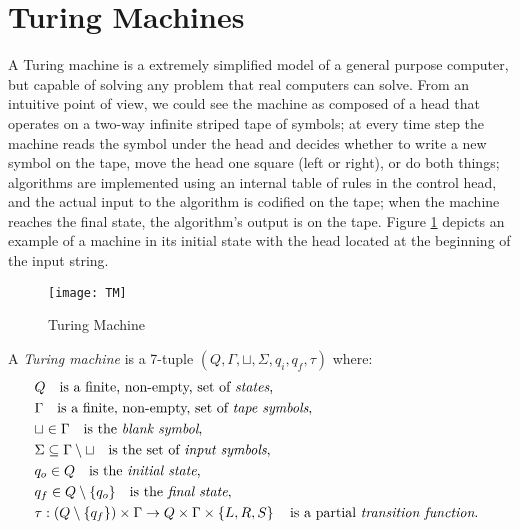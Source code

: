%
%

\section{Turing Machines}
\label{sec:Turing-Machines}

A Turing machine is a extremely simplified model of a general purpose computer, but capable of solving any problem that real computers can solve. From an intuitive point of view, we could see the machine as composed of a head that operates on a two-way infinite striped tape of symbols; at every time step the machine reads the symbol under the head and decides whether to write a new symbol on the tape, move the head one square (left or right), or do both things; algorithms are implemented using an internal table of rules in the control head, and the actual input to the algorithm is codified on the tape; when the machine reaches the final state, the algorithm's output is on the tape. Figure \ref{fig:Turing-Machine} depicts an example of a machine in its initial state with the head located at the beginning of the input string.

\begin{figure}[h]
\centering\texttt{[image: TM]}
\caption{\label{fig:Turing-Machine}Turing Machine}
\end{figure}

\begin{definition}
\label{def:Turing-Machine}
A \emph{Turing machine} is a 7-tuple $\left(Q,\Gamma,\sqcup,\Sigma,q_{i},q_{f},\tau\right)$ where:
\begin{align*}
 & Q \quad \text{is a finite, non-empty, set of \emph{states},} \index{Machine State} \\
 & \Gamma \quad \text{is a finite, non-empty, set of \emph{tape symbols},} \index{Tape Symbol} \\
 & \sqcup\in\Gamma \quad \text{is the \emph{blank symbol},} \index{Blank Symbol} \\
 & \Sigma\subseteq\Gamma\setminus\sqcup \quad \text{is the set of \emph{input symbols},}  \index{Input Symbol} \\
 & q_{o}\in Q \quad \text{is the \emph{initial state},} \index{Initial State} \\
 & q_{f}\in Q \setminus \{q_o\} \quad \text{is the \emph{final state},} \index{Final State} \\ 
 & \tau:\left(Q\setminus \{q_{f}\}\right)\times\Gamma \rightarrow  Q\times\Gamma\times\left\{ L,R,S\right\} \quad\text{is a partial \emph{transition function}. \index{Transition Function} }
\end{align*}
\end{definition}

